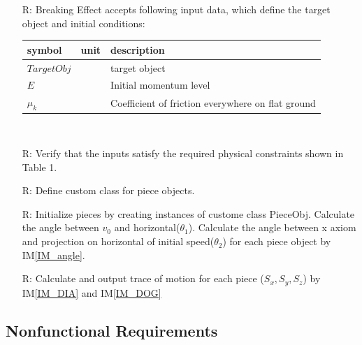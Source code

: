 \documentclass[12pt]{article}
\newcounter{reqnum} %
\begin{document}
	\noindent \begin{itemize}
		
		\item[R\refstepcounter{reqnum}\thereqnum \label{R_Inputs}:] 
		Breaking Effect accepts following input data, which define the target object
		and initial conditions:
		\noindent \begin{longtable*}{l l l} 
			\toprule
			\textbf{symbol} & \textbf{unit} & \textbf{description}\\
			\midrule 
			$TargetObj$ & & target object
			\\
			$E$ & & Initial momentum level
			\\
			$\mu_{k}$ & & Coefficient of friction everywhere on flat ground
			\\
			\bottomrule
		\end{longtable*}
		
		~\newpage
		
		\item[R\refstepcounter{reqnum}\thereqnum \label{R_VerifyOutput}:] Verify that the inputs satisfy the required physical constraints shown in Table 1.
		
		\item[R\refstepcounter{reqnum}\thereqnum \label{R_ClassPiece}:] Define custom class for piece objects.
		
		\item[R\refstepcounter{reqnum}\thereqnum \label{R_Piece}:] Initialize pieces by creating instances of custome class PieceObj. Calculate the angle between $v_{0}$ and horizontal($\theta _{1}$). Calculate the angle between x axiom and projection on horizontal of initial speed($\theta _{2}$) for each piece object by IM\ref{IM_angle}. 
		
		\item[R\refstepcounter{reqnum}\thereqnum \label{R_Output1}:] 
		Calculate and output trace of motion for each piece ($S_{x},S_{y},S_{z}$) by IM\ref{IM_DIA} and IM\ref{IM_DOG}
		
	\end{itemize}
	
	\subsection{Nonfunctional Requirements}
	
\end{document}
